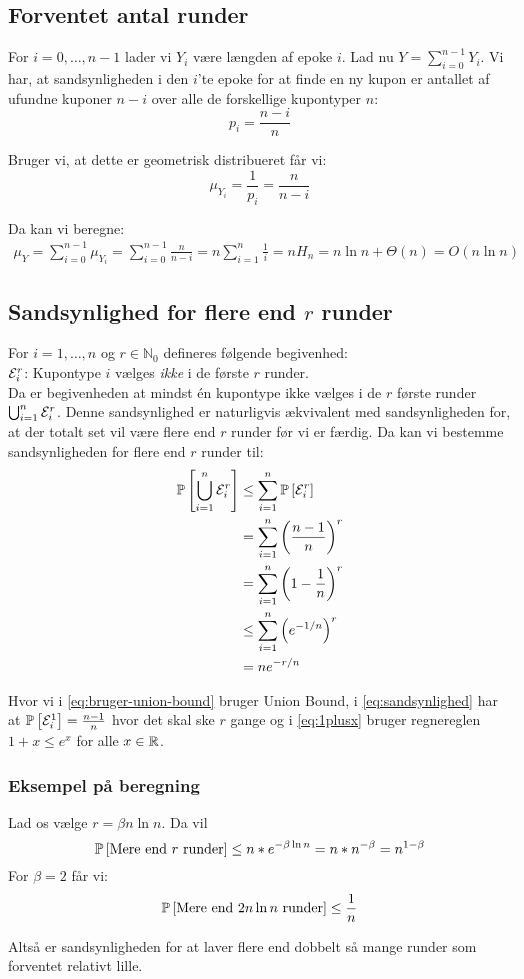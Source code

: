 \subsection{Forventet antal runder}
For $i = 0, \dots, n-1$ lader vi $Y_i$ være længden af epoke $i$. Lad nu $Y = \sum_{i=0}^{n-1} Y_{i}$. Vi har, at sandsynligheden i den $i$'te epoke for at finde en ny kupon er antallet af ufundne kuponer $n-i$ over alle de forskellige kupontyper $n$:
$$
  p_i = \frac{n-i}{n}
$$

Bruger vi, at dette er geometrisk distribueret får vi:
$$
  \mu_{Y_i} = \frac{1}{p_i} = \frac{n}{n-i}
$$

Da kan vi beregne:
\begin{align*}
  \mu_Y
  = \sum_{i=0}^{n-1} \mu_{Y_i}
  = \sum_{i=0}^{n-1} \frac{n}{n-i}
  = n \sum_{i=1}^n \frac{1}{i}
  = n H_n
  = n \ln n + \Theta(n)
  = O(n \ln n)
\end{align*}


\subsection{Sandsynlighed for flere end $r$ runder}
For $i = 1, \dots, n$ og $r \in \mathbb{N}_0$ defineres følgende begivenhed:\\
$\event_i^r$: Kupontype $i$ vælges \emph{ikke} i de første $r$ runder.\\

Da er begivenheden at mindst én kupontype ikke vælges i de $r$ første runder $\bigcup_{i=1}^n \event_i^r$. Denne sandsynlighed er naturligvis ækvivalent med sandsynligheden for, at der totalt set vil være flere end $r$ runder før vi er færdig. Da kan vi bestemme sandsynligheden for flere end $r$ runder til:
\begin{align}
  \P{\bigcup_{i=1}^n \event_i^r}
  &\leq \sum_{i=1}^n \P{\event_i^r} \label{eq:bruger-union-bound} \\
  &= \sum_{i=1}^n \pfrac{n-1}{n}^r \label{eq:sandsynlighed} \\
  &= \sum_{i=1}^n \p{1 - \frac{1}{n}}^r \nonumber \\
  &\leq \sum_{i=1}^n \p{e^{-1/n}}^r \label{eq:1plusx}\\
  &= n e^{-r/n} \nonumber
\end{align}

Hvor vi i \cref{eq:bruger-union-bound} bruger Union Bound, i \cref{eq:sandsynlighed} har at $\P{\event_i^1} = \frac{n-1}{n}$ hvor det skal ske $r$ gange og i \cref{eq:1plusx} bruger regnereglen $1 + x \leq e^x$ for alle $x \in \R$.


\subsubsection{Eksempel på beregning}
Lad os vælge $r = \beta n \ln n$. Da vil
$$
  \P{\text{Mere end $r$ runder}} \leq n * e^{- \beta \ln n} = n * n^{- \beta} = n^{1 - \beta}
$$
For $\beta = 2$ får vi:
$$
  \P{\text{Mere end $2 n \ln n$ runder}} \leq \frac{1}{n}
$$

Altså er sandsynligheden for at laver flere end dobbelt så mange runder som forventet relativt lille.




